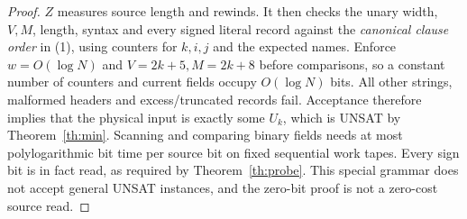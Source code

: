 \documentclass[11pt]{article}
\begin{document}
\begin{proof}
\(Z\) measures source length and rewinds. It then checks the unary width, \(V,M\), length, syntax and every signed literal record against the \emph{canonical clause order} in (1), using counters for \(k,i,j\) and the expected names. Enforce \(w=O(\log N)\) and \(V=2k+5,M=2k+8\) before comparisons, so a constant number of counters and current fields occupy \(O(\log N)\) bits. All other strings, malformed headers and excess/truncated records fail. Acceptance therefore implies that the physical input is exactly some \(U_k\), which is UNSAT by Theorem~\ref{th:min}. Scanning and comparing binary fields needs at most polylogarithmic bit time per source bit on fixed sequential work tapes. Every sign bit is in fact read, as required by Theorem~\ref{th:probe}. This special grammar does not accept general UNSAT instances, and the zero-bit proof is not a zero-cost source read.
\end{proof}
\end{document}

